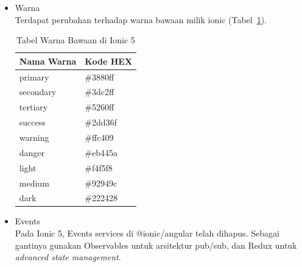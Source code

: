 \begin{enumerate}
\begin{itemize}
\begin{itemize}
			
			\begin{lstlisting}[label={lst:toast}, caption=Kode Program untuk Toast]
async presentToast() {
	const toast = await this.toastController.create({
		message: 'Your settings have been saved.',
		buttons: [	
		{
			text: 'Close',
			role: 'cancel',
			handler: () => {
			console.log('Close clicked');	
		}
		}
		]
	});
toast.present();
}
			\end{lstlisting}
		\end{itemize}
		\newpage
		Selain yang sudah disebutkan, terdapat beberapa komponen lain yang mendapat perubahan di Ionic 5, namun tidak ditulis di dalam dokumen skripsi ini. Komponen-komponen tersebut antara lain Action Sheet, Anchor, Card, FAB, Item, Menu Button, Nav Link, Radio, Segment, Segment Button, Skeleton Text, Split Pane, dan Tabs~\footnote{\textit{`Breaking Changes'} https://github.com/ionic-team/ionic-framework/blob/main/BREAKING.md, Diakses pada 20 November 2021. \label{ref:breakingChangesIonic5}}.
		\item Warna \\
		Terdapat perubahan terhadap warna bawaan milik ionic (Tabel~\ref{table:colors}).
		\begin{table}[H]
		\centering
			\begin{tabular}{|l|l|}
				\hline
				Nama Warna & Kode HEX \\ \hline
				primary    & \#3880ff \\ \hline
				secondary  & \#3dc2ff \\ \hline
				tertiary   & \#5260ff \\ \hline
				success    & \#2dd36f \\ \hline
				warning    & \#ffc409 \\ \hline
				danger     & \#eb445a \\ \hline
				light      & \#f4f5f8 \\ \hline
				medium     & \#92949c \\ \hline
				dark       & \#222428 \\ \hline
			\end{tabular}
			\caption{Tabel Warna Bawaan di Ionic 5}
			\label{table:colors}
		\end{table}
		
		\item Events \\
		Pada Ionic 5, Events services di @ionic/angular telah dihapus. Sebagai gantinya gunakan Observables untuk arsitektur pub/sub, dan Redux untuk {\it advanced state management}.
		

\end{itemize}
\end{enumerate}
